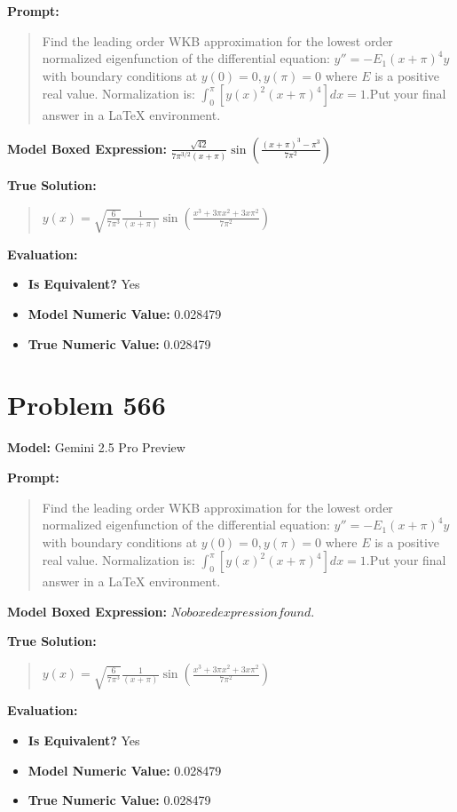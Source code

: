 \documentclass{article}
\begin{document}
\textbf{Prompt:}
\begin{quote}
Find the leading order WKB approximation for the lowest order normalized eigenfunction of the differential equation: $y'' = -E_1 (x+\pi)^4 y$ with boundary conditions at $y(0)=0, y(\pi)=0$ where $E$ is a positive real value. Normalization is: $\int_0^\pi [y(x)^2 (x+\pi)^4] dx = 1$.Put your final answer in a LaTeX \boxed{} environment.
\end{quote}
\textbf{Model Boxed Expression:} $\frac{\sqrt{42}}{7\pi^{3/2}(x+\pi)} \sin\left(\frac{(x+\pi)^3 - \pi^3}{7\pi^2}\right)$

\textbf{True Solution:}
\begin{quote}
$y(x)=\sqrt{\frac{6}{7\pi^3 }}\frac{1}{(x +\pi)} \sin(\frac{x^3 + 3 \pi x^2 + 3x \pi^2}{7\pi^2})$
\end{quote}

\textbf{Evaluation:}
\begin{itemize}
\item \textbf{Is Equivalent?} Yes
\item \textbf{Model Numeric Value:} 0.028479
\item \textbf{True Numeric Value:} 0.028479
\end{itemize}
\vspace{1cm}
\section*{Problem 566}
\textbf{Model:} Gemini 2.5 Pro Preview

\textbf{Prompt:}
\begin{quote}
Find the leading order WKB approximation for the lowest order normalized eigenfunction of the differential equation: $y'' = -E_1 (x+\pi)^4 y$ with boundary conditions at $y(0)=0, y(\pi)=0$ where $E$ is a positive real value. Normalization is: $\int_0^\pi [y(x)^2 (x+\pi)^4] dx = 1$.Put your final answer in a LaTeX \boxed{} environment.
\end{quote}
\textbf{Model Boxed Expression:} $No boxed expression found.$

\textbf{True Solution:}
\begin{quote}
$y(x)=\sqrt{\frac{6}{7\pi^3 }}\frac{1}{(x +\pi)} \sin(\frac{x^3 + 3 \pi x^2 + 3x \pi^2}{7\pi^2})$
\end{quote}

\textbf{Evaluation:}
\begin{itemize}
\item \textbf{Is Equivalent?} Yes
\item \textbf{Model Numeric Value:} 0.028479
\item \textbf{True Numeric Value:} 0.028479
\end{itemize}
\vspace{1cm}
\end{document}
